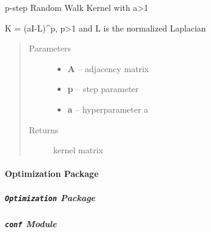 \documentclass[letterpaper,10pt,english]{sphinxmanual}
\begin{document}
\begin{fulllineitems}
\label{pyGPs.GraphExtensions:pyGPs.GraphExtensions.nodeKernels.rwKernel}
p-step Random Walk Kernel with a\textgreater{}1

K = (aI-L)\textasciicircum{}p, p\textgreater{}1 and L is the normalized Laplacian
\begin{quote}\begin{description}
\item[{Parameters}] \leavevmode\begin{itemize}
\item {} 
\textbf{A} -- adjacency matrix

\item {} 
\textbf{p} -- step parameter

\item {} 
\textbf{a} -- hyperparameter a

\end{itemize}

\item[{Returns}] \leavevmode
kernel matrix

\end{description}\end{quote}

\end{fulllineitems}



\paragraph{Optimization Package}
\label{pyGPs.Optimization:optimization-package}\label{pyGPs.Optimization::doc}

\subparagraph{\texttt{Optimization} Package}
\label{pyGPs.Optimization:id1}\label{pyGPs.Optimization:module-pyGPs.Optimization}

\subparagraph{\texttt{conf} Module}
\label{pyGPs.Optimization:conf-module}\label{pyGPs.Optimization:module-pyGPs.Optimization.conf}
\end{document}
